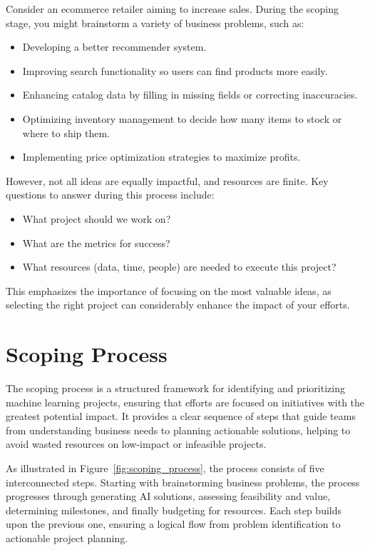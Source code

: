 \documentclass[12pt,openany]{book}
\begin{document}
\begin{examplebox}
Consider an ecommerce retailer aiming to increase sales. During the scoping stage, you might brainstorm a variety of business problems, such as:
\begin{itemize}
    \item Developing a better recommender system.
    \item Improving search functionality so users can find products more easily.
    \item Enhancing catalog data by filling in missing fields or correcting inaccuracies.
    \item Optimizing inventory management to decide how many items to stock or where to ship them.
    \item Implementing price optimization strategies to maximize profits.
\end{itemize}
However, not all ideas are equally impactful, and resources are finite. Key questions to answer during this process include:
\begin{itemize}
    \item What project should we work on?
    \item What are the metrics for success?
    \item What resources (data, time, people) are needed to execute this project?
\end{itemize}
This emphasizes the importance of focusing on the most valuable ideas, as selecting the right project can considerably enhance the impact of your efforts.
\end{examplebox}

\chapter{Scoping Process}

The scoping process is a structured framework for identifying and prioritizing machine learning projects, ensuring that efforts are focused on initiatives with the greatest potential impact. It provides a clear sequence of steps that guide teams from understanding business needs to planning actionable solutions, helping to avoid wasted resources on low-impact or infeasible projects. \newline

As illustrated in Figure~\ref{fig:scoping_process}, the process consists of five interconnected steps. Starting with brainstorming business problems, the process progresses through generating AI solutions, assessing feasibility and value, determining milestones, and finally budgeting for resources. Each step builds upon the previous one, ensuring a logical flow from problem identification to actionable project planning. 
\end{document}
